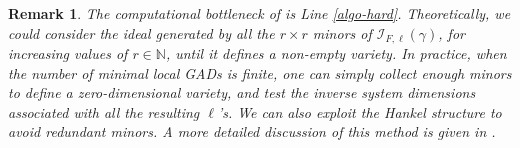 \documentclass{amsart}
\theoremstyle{plain}
\newtheorem{remark}[remark]{Remark}
\newcommand{\N}{\mathbb{N}}
\numberwithin{equation}{section}
\begin{document}
\vspace{0.1cm}
\begin{remark} \label{rmk:difficultPart}
    The computational bottleneck of  is Line \ref{algo-hard}. 
    Theoretically, we could consider the ideal generated by all the $r \times r$ minors of $\mathcal{I}_{F,\ell}(\gamma)$, for increasing values of $r \in \N$, until it defines a non-empty variety.
    In practice, when the number of minimal local GADs is finite, one can simply collect enough minors to define a zero-dimensional variety, and test the inverse system dimensions associated with all the resulting $\ell$'s.
    We can also exploit the Hankel structure to avoid redundant minors.  
    A more detailed discussion of this method is given in .
\end{remark}
\end{document}
